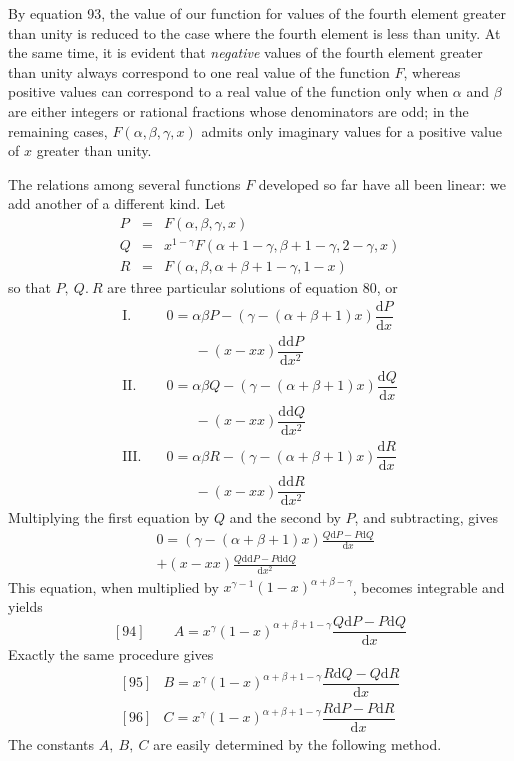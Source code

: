 By equation 93, the value of our function for values of the fourth element greater than unity is reduced to the case where the fourth element is less than unity. At the same time, it is evident that \textit{negative} values of the fourth element greater than unity always correspond to one real value of the function \(F\), whereas positive values can correspond to a real value of the function only when \(\alpha\) and \(\beta\) are either integers or rational fractions whose denominators are odd; in the remaining cases, \(F(\alpha,\beta,\gamma,x)\) admits only imaginary values for a positive value of \(x\) greater than unity.

The relations among several functions \(F\) developed so far have all been linear: we add another of a different kind. Let
\[
\begin{array}{rcl}
P&=&F(\alpha,\beta,\gamma,x)\\
Q&=&x^{1-\gamma}F(\alpha+1-\gamma,\beta+1-\gamma,2-\gamma,x)\\
R&=&F(\alpha,\beta,\alpha+\beta+1-\gamma,1-x)
\end{array}
\]
so that \(P,\ Q.\ R\) are three particular solutions of equation 80, or
\[
\begin{aligned}
\mathrm{I.}\quad&0=\alpha\beta P-(\gamma-(\alpha+\beta+1)x)\dfrac{\mathrm dP}{\mathrm dx}\\&\qquad-(x-xx)\dfrac{\mathrm{dd}P}{\mathrm dx^2}\\[4pt]
\mathrm{II.}\quad&0=\alpha\beta Q-(\gamma-(\alpha+\beta+1)x)\dfrac{\mathrm dQ}{\mathrm dx}\\&\qquad-(x-xx)\dfrac{\mathrm{dd}Q}{\mathrm dx^2}\\[4pt]
\mathrm{III.}\quad&0=\alpha\beta R-(\gamma-(\alpha+\beta+1)x)\dfrac{\mathrm dR}{\mathrm dx}\\&\qquad-(x-xx)\dfrac{\mathrm{dd}R}{\mathrm dx^2}
\end{aligned}
\]
Multiplying the first equation by \(Q\) and the second by \(P\), and subtracting, gives
\[
\begin{aligned}&0=(\gamma-(\alpha+\beta+1)x)\frac{Q\mathrm dP-P\mathrm dQ}{\mathrm dx}\\&+(x-xx)\frac{Q\mathrm{dd}P-P\mathrm{dd}Q}{\mathrm dx^2}\end{aligned}
\]
This equation, when multiplied by \(x^{\gamma-1}(1-x)^{\alpha+\beta-\gamma}\), becomes integrable and yields
\[
[94]\qquad A=x^\gamma(1-x)^{\alpha+\beta+1-\gamma}\frac{Q\mathrm dP-P\mathrm dQ}{\mathrm dx}
\]
Exactly the same procedure gives
\[
\begin{array}{rl}
[95]&B=x^\gamma(1-x)^{\alpha+\beta+1-\gamma}\dfrac{R\mathrm dQ-Q\mathrm dR}{\mathrm dx}\\[11pt]
[96]&C=x^\gamma(1-x)^{\alpha+\beta+1-\gamma}\dfrac{R\mathrm dP-P\mathrm dR}{\mathrm dx}
\end{array}
\]
The constants \(A,\ B,\ C\) are easily determined by the following method.

